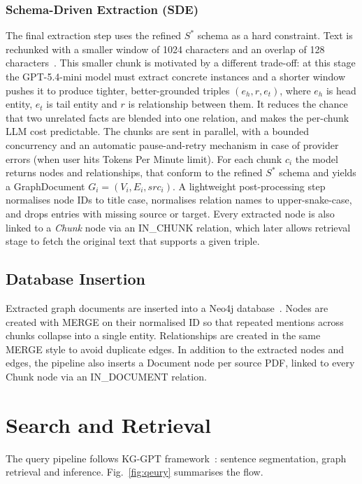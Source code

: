 \documentclass[conference]{IEEEtran}
\begin{document}
\subsubsection{Schema-Driven Extraction (SDE)}
The final extraction step uses the refined $S^{\ast}$ schema as a hard constraint. Text is rechunked with a smaller window of {1024 characters and an overlap of 128 characters}~\cite{shereshevsky2026}. This smaller chunk is motivated by a different trade-off: at this stage the GPT-5.4-mini model must extract concrete instances and a shorter window pushes it to produce tighter, better-grounded triples $(e_h, r, e_t)$, where $e_h$ is head entity, $e_t$ is tail entity and $r$ is relationship between them. It reduces the chance that two unrelated facts are blended into one relation, and makes the per-chunk LLM cost predictable. The chunks are sent in parallel, with a bounded concurrency and an automatic pause-and-retry mechanism in case of provider errors (when user hits Tokens Per Minute limit). For each chunk $c_i$ the model returns nodes and relationships, that conform to the refined $S^{\ast}$ schema and yields a GraphDocument $G_i = (V_i, E_i, src_i)$. A lightweight post-processing step normalises node IDs to title case, normalises relation names to upper-snake-case, and drops entries with missing source or target. Every extracted node is also linked to a \textit{Chunk} node via an IN\_CHUNK relation, which later allows retrieval stage to fetch the original text that supports a given triple.




\subsection{Database Insertion}
Extracted graph documents are inserted into a {Neo4j database}~\cite{neo4j}. Nodes are created with MERGE on their normalised ID so that repeated mentions across chunks collapse into a single entity. Relationships are created in the same MERGE style to avoid duplicate edges. In addition to the extracted nodes and edges, the pipeline also inserts a Document node per source PDF, linked to every Chunk node via an IN\_DOCUMENT relation.

\section{Search and Retrieval}
The query pipeline follows {KG-GPT framework}~\cite{kggpt2023}: sentence segmentation, graph retrieval and inference. Fig.~\ref{fig:qeury} summarises the flow.
\end{document}
